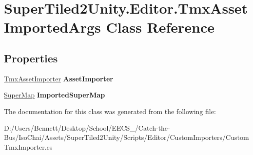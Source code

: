 \hypertarget{class_super_tiled2_unity_1_1_editor_1_1_tmx_asset_imported_args}{}\section{Super\+Tiled2\+Unity.\+Editor.\+Tmx\+Asset\+Imported\+Args Class Reference}
\label{class_super_tiled2_unity_1_1_editor_1_1_tmx_asset_imported_args}
\subsection*{Properties}
\begin{DoxyCompactItemize}
\item 
\mbox{\label{class_super_tiled2_unity_1_1_editor_1_1_tmx_asset_imported_args_af7fc93da6e601b68adfae12558368891}} 
\mbox{\hyperlink{class_super_tiled2_unity_1_1_editor_1_1_tmx_asset_importer}{Tmx\+Asset\+Importer}} {\bfseries Asset\+Importer}
\item 
\mbox{\label{class_super_tiled2_unity_1_1_editor_1_1_tmx_asset_imported_args_a284853f78e178f95e8568ea991fb7890}} 
\mbox{\hyperlink{class_super_tiled2_unity_1_1_super_map}{Super\+Map}} {\bfseries Imported\+Super\+Map}
\end{DoxyCompactItemize}


The documentation for this class was generated from the following file\+:\begin{DoxyCompactItemize}
\item 
D\+:/\+Users/\+Bennett/\+Desktop/\+School/\+E\+E\+C\+S\+\_/\+Catch-\/the-\/\+Bus/\+Iso\+Chai/\+Assets/\+Super\+Tiled2\+Unity/\+Scripts/\+Editor/\+Custom\+Importers/Custom\+Tmx\+Importer.\+cs\end{DoxyCompactItemize}
